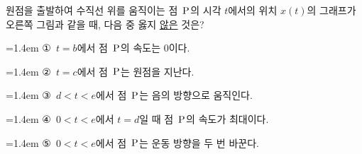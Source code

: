 \noindent\begin{minipage}[t]{0.58\linewidth}\vspace{0pt}\raggedright 원점을 출발하여 수직선 위를 움직이는 점~$\mathrm{P}$의 시각 $t$에서의 위치 $x(t)$의 그래프가 오른쪽 그림과 같을 때, 다음 중 옳지 \underline{않은} 것은?\end{minipage}\hfill\begin{minipage}[t]{0.4\linewidth}\vspace{0pt}\centering \resizebox{\ifdim\width>\linewidth\linewidth\else\width\fi}{!}{}\end{minipage}\par
\par\medskip\par\noindent\hangindent=1.4em {\small ①}\ $t=b$에서 점~$\mathrm{P}$의 속도는 $0$이다.\par\noindent\hangindent=1.4em {\small ②}\ $t=c$에서 점~$\mathrm{P}$는 원점을 지난다.\par\noindent\hangindent=1.4em {\small ③}\ $d<t<e$에서 점~$\mathrm{P}$는 음의 방향으로 움직인다.\par\noindent\hangindent=1.4em {\small ④}\ $0<t<e$에서 $t=d$일 때 점~$\mathrm{P}$의 속도가 최대이다.\par\noindent\hangindent=1.4em {\small ⑤}\ $0<t<e$에서 점~$\mathrm{P}$는 운동 방향을 두 번 바꾼다.\par\medskip
